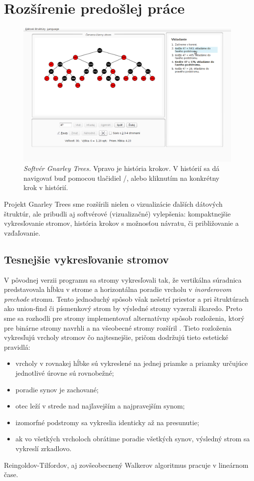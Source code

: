 \section{Rozšírenie predošlej práce}

\begin{figure}
\includegraphics[width=2\columnwidth]{obrazky/historia.png}
\caption{\emph{Softvér Gnarley Trees.} Vpravo je história krokov. V histórií 
sa dá navigovať buď pomocou tlačidiel /, alebo kliknutím na 
konkrétny krok v histórií.}
\label{img:historia} 
\end{figure}

Projekt Gnarley Trees sme rozšírili nielen o vizualizácie ďalších dátových
štruktúr, ale pribudli aj softvérové (vizualizačné) vylepšenia:
kompaktnejšie vykresľovanie stromov, história krokov s možnosťou návratu,
či približovanie a vzďaľovanie.

\subsection{Tesnejšie vykresľovanie stromov}

V pôvodnej verzii programu sa stromy vykresľovali tak, že vertikálna súradnica 
predstavovala hĺbku v strome a horizontálna poradie vrcholu v \emph{
inorderovom prechode} stromu. Tento jednoduchý spôsob však nešetrí priestor
a pri štruktúrach ako union-find či písmenkový strom by výsledné stromy 
vyzerali škaredo. Preto sme sa rozhodli pre stromy implementovať 
alternatívny spôsob rozloženia, ktorý pre binárne stromy navrhli \citet{reingold}
a na všeobecné stromy rozšíril \citet{walker}. Tieto rozloženia vykresľujú
vrcholy stromov čo najtesnejšie, pričom dodržujú tieto estetické pravidlá: 
\begin{itemize} 
\item vrcholy v rovnakej hĺbke sú vykreslené na jednej priamke a priamky 
určujúce jednotlivé úrovne sú rovnobežné; 
\item poradie synov je zachované; 
\item otec leží v strede nad najľavejším a najpravejším synom; 
\item izomorfné podstromy sa vykreslia identicky až na presunutie;
\item ak vo všetkých vrcholoch obrátime poradie všetkých synov, výsledný strom 
sa vykreslí zrkadlovo.
\end{itemize}
Reingoldov-Tilfordov, aj zovšeobecnený Walkerov algoritmus pracuje v lineárnom
čase.
